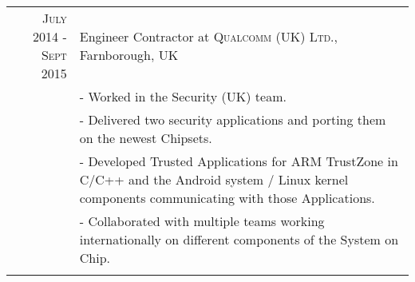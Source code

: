 \documentclass[a4paper,10pt]{article} %
\begin{document}
\begin{tabular}{r|p{11cm}}
    \textsc{July 2014 - Sept 2015} & Engineer Contractor at \textsc{Qualcomm (UK) Ltd.}, Farnborough, UK\\ 
                              & \footnotesize{
                                - Worked in the Security (UK) team.} \\
                              & \footnotesize{
                                - Delivered two security applications and
                                porting them on the newest Chipsets.}\\
                              & \footnotesize{
                                - Developed Trusted Applications for ARM
                                TrustZone in C/C++ and the Android system /
                                Linux kernel components
                                communicating with those Applications.} \\
                              & \footnotesize{
                                - Collaborated with
                                multiple teams working internationally on
                                different components of the System on Chip.}\\
\multicolumn{2}{c}{} \\



\end{tabular}

\end{document}
